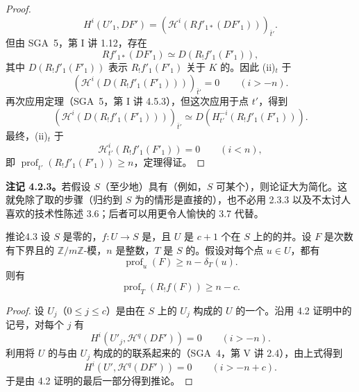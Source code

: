 \begin{proof}
\[
H^i(U'_1,DF')=(\mathcal H^i(Rf'_{1*}(DF'_1)))_{\bar t'}.
\]
但由 SGA~5，第 I 讲 1.12，存在
\[
Rf'_{1*}(DF'_1)\simeq D(R_!f'_1(F'_1)),
\]
其中 $D(R_!f'_1(F'_1))$ 表示 $R_!f'_1(F'_1)$ 关于 $K$ 的。因此 (ii)$_t$ 于
\[
(\mathcal H^i(D(R_!f'_1(F'_1))))_{\bar t'}=0\qquad(i>-n).
\]
再次应用定理（SGA~5，第 I 讲 4.5.3），但这次应用于点 $t'$，得到
\[
(\mathcal H^i(D(R_!f'_1(F'_1))))_{\bar t'}
\simeq D(H^{-i}_{t'}(R_!f'_1(F'_1))).
\]
最终，(ii)$_t$ 于
\[
\mathcal H^i_{t'}(R_!f'_1(F'_1))=0\qquad(i<n),
\]
即 $\operatorname{prof}_{t'}(R_!f'_1(F'_1))\geq n$，定理得证。
\end{proof}
\textbf{注记 4.2.3。}若假设 $S$（至少地）具有（例如，$S$ 可某个），则论证大为简化。这就免除了取的步骤（归约到 $S$ 为的情形是直接的），也不必用 2.3.3 以及不太讨人喜欢的技术性陈述 3.6；后者可以用更令人愉快的 3.7 代替。

\begin{SGAresult}{推论}{4.3}
设 $S$ 是零的，$f:U\to S$ 是，且 $U$ 是 $c+1$ 个在 $S$ 上的的并。设 $F$ 是次数有下界且的 $\mathbb Z/m\mathbb Z$-模，$n$ 是整数，$T$ 是 $S$ 的。假设对每个点 $u\in U$，都有
\[
\operatorname{prof}_u(F)\geq n-\delta_T(u).
\]
则有
\[
\operatorname{prof}_T(R_!f(F))\geq n-c.
\]
\end{SGAresult}
\begin{proof}
设 $U_j$（$0\leq j\leq c$）是由在 $S$ 上的 $U_j$ 构成的 $U$ 的一个。沿用 4.2 证明中的记号，对每个 $j$ 有
\[
H^i(U'_j,\mathcal H^q(DF'))=0\qquad(i>-n).
\]
利用将 $U$ 的与由 $U_j$ 构成的的联系起来的（SGA~4，第 V 讲 2.4），由上式得到
\[
H^i(U',\mathcal H^q(DF'))=0\qquad(i>-n+c).
\]
于是由 4.2 证明的最后一部分得到推论。
\end{proof}

